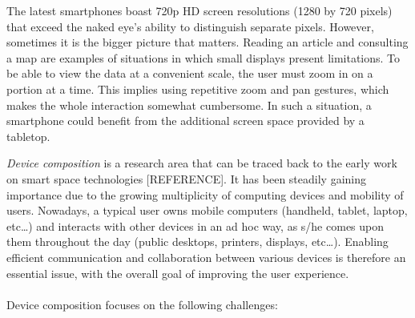 The latest smartphones boast 720p HD screen resolutions (1280 by 720 pixels) that exceed the naked eye's ability to distinguish separate pixels.
However, sometimes it is the bigger picture that matters.
Reading an article and consulting a map are examples of situations in which small displays present limitations.
To be able to view the data at a convenient scale, the user must zoom in on a portion at a time.
This implies using repetitive zoom and pan gestures, which makes the whole interaction somewhat cumbersome.
In such a situation, a smartphone could benefit from the additional screen space provided by a tabletop.

\emph{Device composition} is a research area that can be traced back to the early work on smart space technologies [REFERENCE].
It has been steadily gaining importance due to the growing multiplicity of computing devices and mobility of users.
Nowadays, a typical user owns mobile computers (handheld, tablet, laptop, etc\ldots) and interacts with other devices in an ad hoc way, as s/he comes upon them throughout the day (public desktops, printers, displays, etc\ldots).
Enabling efficient communication and collaboration between various devices is therefore an essential issue, with the overall goal of improving the user experience.
\\\\
Device composition focuses on the following challenges:

